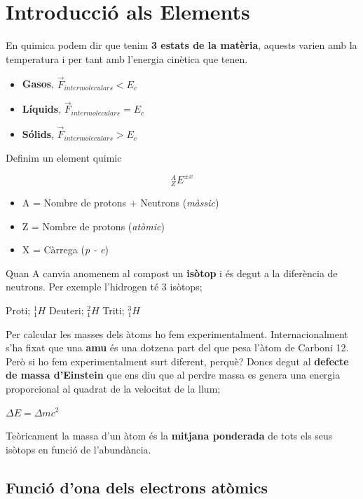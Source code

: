 \documentclass[12pt]{article}
\begin{document}
\tableofcontents

\newpage

\section{Introducció als Elements}

En quimica podem dir que tenim \textbf{3 estats de la matèria}, aquests varien amb la temperatura i per tant amb l'energia cinètica que tenen.

\begin{itemize}
    \item \textbf{Gasos}, $\vec{F}_{intermoleculars} < E_c$
    \item \textbf{Líquids}, $\vec{F}_{intermoleculars} = E_c$
    \item \textbf{Sólids}, $\vec{F}_{intermoleculars} > E_c$
\end{itemize}

Definim un element quimic

\[
{}^{A}_{Z}E^{\pm x}
\]

\begin{itemize}
    \item A = Nombre de protons + Neutrons (\textit{màssic})
    \item Z = Nombre de protons (\textit{atòmic})
    \item X = Càrrega (\textit{p - e})
\end{itemize}

Quan A canvia anomenem al compost un \textbf{isòtop} i és degut a la diferència de neutrons. Per exemple l'hidrogen té 3 isòtops;

Proti; ${}^{1}_{1}H$
Deuteri; ${}^{2}_{1}H$
Triti; ${}^{3}_{1}H$

Per calcular les masses dels àtoms ho fem experimentalment. Internacionalment s'ha fixat que una \textbf{amu} és una dotzena part del que pesa l'àtom de Carboni 12. Però si ho fem experimentalment surt diferent, perquè?
Doncs degut al \textbf{defecte de massa d'Einstein} que ens diu que al perdre massa es genera una energia proporcional al quadrat de la velocitat de la llum;

$\Delta E = \Delta m c^2$

Teòricament la massa d'un àtom és la \textbf{mitjana ponderada} de tots els seus isòtops en funció de l'abundància.

\subsection{Funció d'ona dels electrons atòmics}
\end{document}
